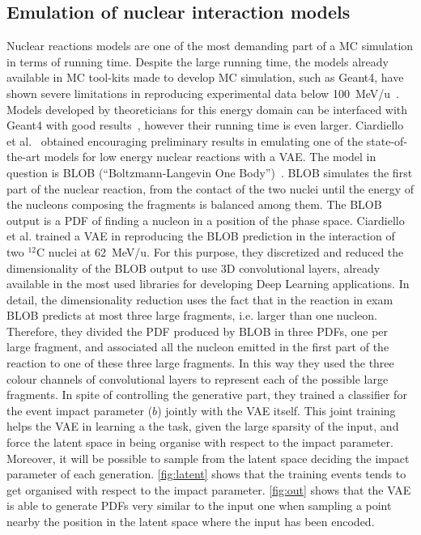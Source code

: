 


\subsection{Emulation of nuclear interaction models}
Nuclear reactions models are one of the most demanding part of a MC simulation in terms of running time. Despite the large running time, the models already available in MC tool-kits made to develop MC simulation, such as Geant4, have shown severe limitations in reproducing experimental data below 100~MeV/u~\cite{g4-med}. Models developed by theoreticians for this energy domain can be interfaced with Geant4 with good results~\cite{blob-g4}, however their running time is even larger. Ciardiello et al.~\cite{blob-emulation} obtained encouraging preliminary results 
in emulating one of the state-of-the-art models for low energy nuclear reactions with a VAE. The model in question is BLOB (``Boltzmann-Langevin One Body'')~\cite{blob}. BLOB simulates the first part of the nuclear reaction, from the contact of the two nuclei until the energy of the nucleons composing the fragments is balanced among them. The BLOB output is a PDF of finding a nucleon in a position of the phase space. Ciardiello et al. trained a VAE in reproducing the BLOB prediction in the interaction of two $^{12}$C nuclei at 62~MeV/u. For this purpose, they discretized and reduced the dimensionality of the BLOB output to use 3D convolutional layers, already available in the most used libraries for developing Deep Learning applications. In detail, the dimensionality reduction uses the fact that in the reaction in exam BLOB predicts at most three large fragments, i.e. larger than one nucleon. Therefore, they divided the PDF produced by BLOB in three PDFs, one per large fragment, and associated all the nucleon emitted in the first part of the reaction to one of these three large fragments. In this way they used the three colour channels of convolutional layers to represent each of the possible large fragments. In spite of controlling the generative part, they trained a classifier for the event impact parameter ($b$) jointly with the VAE itself. This joint training helps the VAE in learning a the task, given the large sparsity of the input, and force the latent space in being organise with respect to the impact parameter. Moreover, it will be possible to sample from the latent space deciding the impact parameter of each generation.
\autoref{fig:latent} shows that the training events tends to get organised with respect to the impact parameter. \autoref{fig:out} shows that the VAE is able to generate PDFs very similar to the input one when sampling a point nearby the position in the latent space where the input has been encoded.

